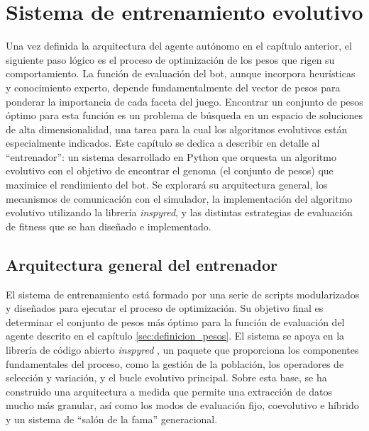 \chapter{Sistema de entrenamiento evolutivo} \label{chap:entrenador}

Una vez definida la arquitectura del agente autónomo en el capítulo anterior, el siguiente paso lógico es el proceso de optimización de los pesos que rigen su comportamiento. La función de evaluación del bot, aunque incorpora heurísticas y conocimiento experto, depende fundamentalmente del vector de pesos para ponderar la importancia de cada faceta del juego. Encontrar un conjunto de pesos óptimo para esta función es un problema de búsqueda en un espacio de soluciones de alta dimensionalidad, una tarea para la cual los algoritmos evolutivos están especialmente indicados. Este capítulo se dedica a describir en detalle al ``entrenador'': un sistema desarrollado en Python que orquesta un algoritmo evolutivo con el objetivo de encontrar el genoma (el conjunto de pesos) que maximice el rendimiento del bot. Se explorará su arquitectura general, los mecanismos de comunicación con el simulador, la implementación del algoritmo evolutivo utilizando la librería \textit{inspyred}, y las distintas estrategias de evaluación de fitness que se han diseñado e implementado.


\section{Arquitectura general del entrenador} \label{sec:arquitectura_entrenador}

El sistema de entrenamiento está formado por una serie de scripts modularizados y diseñados para ejecutar el proceso de optimización. Su objetivo final es determinar el conjunto de pesos más óptimo para la función de evaluación del agente descrito en el capítulo \ref{sec:definicion_pesos}. El sistema se apoya en la librería de código abierto \textit{inspyred} \cite{garrett_aarongarrettinspyred_2012}, un paquete que proporciona los componentes fundamentales del proceso, como la gestión de la población, los operadores de selección y variación, y el bucle evolutivo principal. Sobre esta base, se ha construido una arquitectura a medida que permite una extracción de datos mucho más granular, así como los modos de evaluación fijo, coevolutivo e híbrido y un sistema de ``salón de la fama'' generacional.

